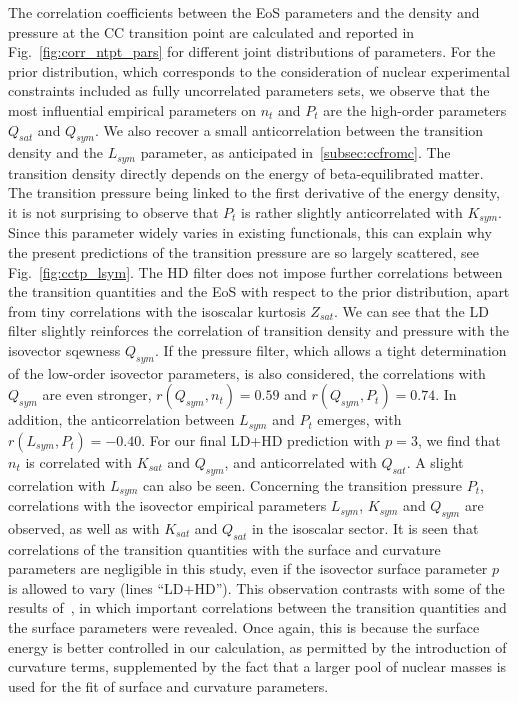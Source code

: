 The correlation coefficients between the EoS parameters and the density and
pressure at the CC transition point are calculated and reported in 
Fig.~\ref{fig:corr_ntpt_pars} for different joint distributions of parameters.
For the prior distribution, which corresponds to the consideration of nuclear
experimental constraints included as fully uncorrelated parameters sets, we 
observe that the most influential empirical parameters on $n_t$ and $P_t$ are 
the high-order parameters $Q_{sat}$ and $Q_{sym}$.
We also recover a small anticorrelation between the transition density and the 
$L_{sym}$ parameter, as anticipated in~\ref{subsec:ccfromc}. The transition 
density directly depends on the energy of beta-equilibrated matter. The 
transition pressure being linked to the first derivative of the energy density, 
it is not surprising to observe that $P_t$ is rather slightly anticorrelated 
with $K_{sym}$. Since this parameter widely varies in existing functionals, 
this can explain why the present predictions of the transition pressure are so 
largely scattered, see Fig.~\ref{fig:cctp_lsym}.
The HD filter does not impose further correlations between the transition
quantities and the EoS with respect to the prior distribution, apart from tiny 
correlations with the isoscalar kurtosis $Z_{sat}$. We can see that the LD 
filter slightly reinforces the correlation of transition density and pressure 
with the isovector sqewness $Q_{sym}$. If the pressure filter, which allows a
tight determination of the low-order isovector parameters, is also
considered, the correlations with $Q_{sym}$ are even stronger,
$r(Q_{sym},n_t)=0.59$ and $r(Q_{sym},P_t)=0.74$. In addition, the 
anticorrelation between $L_{sym}$ and $P_t$ emerges, with 
$r(L_{sym},P_t)=-0.40$. For our final LD+HD prediction with $p=3$, we find that
$n_t$ is correlated with $K_{sat}$ and $Q_{sym}$, and anticorrelated with
$Q_{sat}$. A slight correlation with $L_{sym}$ can also be seen. Concerning the
transition pressure $P_t$, correlations with the isovector empirical parameters
$L_{sym}$, $K_{sym}$ and $Q_{sym}$ are observed, as well as with 
$K_{sat}$ and $Q_{sat}$ in the isoscalar sector.
It is seen that correlations of the transition quantities with the surface and
curvature parameters are negligible in this study, even if the isovector
surface parameter $p$ is allowed to vary (lines ``LD+HD''). This observation
contrasts with some of the results of~\cite{Carreau2019cc}, in which 
important correlations between the transition quantities and the surface
parameters were revealed. Once again, this is because the surface energy is
better controlled in our calculation, as permitted by the introduction of 
curvature terms, supplemented by the fact that a larger pool of nuclear masses 
is used for the fit of surface and curvature parameters.

